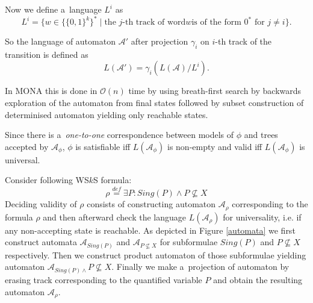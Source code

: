 Now we define a~language $L^i$ as
\begin{equation}
 L^i = \{w \in \{\{0, 1\}^k\}^* \mid \text{the $j$-th track of word} \mathit{w}
 \text{is of the form $0^*$ for $j \neq i$}\}. \end{equation}
 
 So the language of automaton $\mathcal{A}'$ after projection $\gamma_i$ on
 $i$-th track of the transition is defined as
 \begin{equation}
  L(\mathcal{A}') = \gamma_i(L(\mathcal{A}) / L^i).
 \end{equation}
 
 In \textsc{MONA} \cite{mona} this is done in $\mathcal{O}(n)$ time by using
 breath-first search by backwards exploration of the automaton from final
 states followed by subset construction of determinised automaton yielding only
 reachable states.

\begin{prop}
 Since there is a~\emph{one-to-one} correspondence between models of $\phi$ and
 trees accepted by $\mathcal{A}_\phi$, $\phi$ is satisfiable iff
 $L(\mathcal{A}_\phi)$ is non-empty and valid iff $L(\mathcal{A}_\phi)$  is
 universal.
\end{prop}

  \noindent\hrulefill
  \begin{example}
  Consider following WS$k$S formula:
  \begin{equation}
  \rho \overset{\mathit{def}}{=} \exists P:
 Sing(P) \wedge P \not\subseteq X
  \end{equation}
  Deciding validity of $\rho$ consists of constructing automaton
  $\mathcal{A}_\rho$ corresponding to the formula $\rho$ and then afterward
  check the language $L(\mathcal{A}_\rho)$ for universality, i.e. if any
  non-accepting state is reachable. As depicted in Figure \ref{automata} we
  first construct automata $\mathcal{A}_{\mathit{Sing}(P)}$ and
  $\mathcal{A}_{P \not\subseteq X}$ for subformulae $\mathit{Sing}(P)$ and $P
  \not\subseteq X$ respectively. Then we construct product automaton of those
  subformulae yielding automaton $\mathcal{A}_{\mathit{Sing}(P) \wedge } P
  \not\subseteq X$. Finally we make a~projection of automaton by erasing track
  corresponding to the quantified variable $P$ and obtain the resulting
  automaton $\mathcal{A}_\rho$.

  \end{example}\label{wsks-formula-restricted}
 
